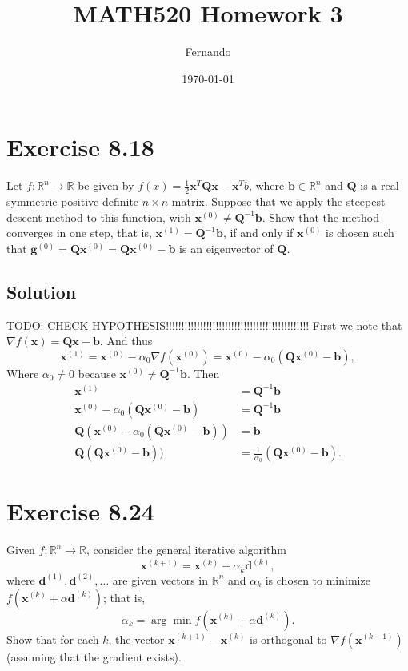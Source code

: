 \documentclass{article}
\newcommand{\bld}[1]{\boldsymbol{#1}}
\begin{document}
\title{MATH520 Homework 3}
\author{Fernando}
\date{\today}
\maketitle

\section*{Exercise 8.18}
Let $f:\mathbb{R}^n\to\mathbb{R}$ be given by
$f(x)=\frac{1}{2}\bld{x}^T\bld{Q}\bld{x}-\bld{x}^Tb$, where
$\bld{b}\in\mathbb{R}^n$ and $\bld{Q}$ is a real symmetric positive definite
$n\times n$ matrix. Suppose that we apply the steepest descent method to this
function, with $\bld{x}^{(0)}\neq \bld{Q}^{-1}\bld{b}$. Show that the method
converges in one step, that is, $\bld{x}^{(1)}=\bld{Q}^{-1}\bld{b}$, if and
only if $\bld{x}^{(0)}$ is chosen such that
$\bld{g}^{(0)}=\bld{Q}\bld{x}^{(0)}=\bld{Q}\bld{x}^{(0)}-\bld{b}$ is an
eigenvector of $\bld{Q}$.
\subsection*{Solution}
TODO: CHECK HYPOTHESIS!!!!!!!!!!!!!!!!!!!!!!!!!!!!!!!!!!!!!!!!!!!!!!
First we note that $\nabla f(\bld{x})=\bld{Q}\bld{x}-\bld{b}$. And thus
\[
\bld{x}^{(1)}=\bld{x}^{(0)}-\alpha_0\nabla
f(\bld{x}^{(0)})=\bld{x}^{(0)}-\alpha_0(\bld{Q}\bld{x}^{(0)}-\bld{b}),
\]
Where $\alpha_0\neq 0$ because $\bld{x}^{(0)}\neq \bld{Q}^{-1}\bld{b}$.
Then
\begin{align*}
	\bld{x}^{(1)}&=\bld{Q}^{-1}\bld{b}\\
	\bld{x}^{(0)}-\alpha_0(\bld{Q}\bld{x}^{(0)}-\bld{b})&=\bld{Q}^{-1}\bld{b}\\
	\bld{Q}(\bld{x}^{(0)}-\alpha_0(\bld{Q}\bld{x}^{(0)}-\bld{b}))&=\bld{b}\\
	\bld{Q}(\bld{Q}\bld{x}^{(0)}-\bld{b}))&=\frac{1}{\alpha_0}(\bld{Q}\bld{x}^{(0)}-\bld{b}).
\end{align*}
\section*{Exercise 8.24}
Given $f:\mathbb{R}^n\to \mathbb{R}$, consider the general iterative algorithm
\[
	\bld{x}^{(k+1)}=\bld{x}^{(k)}+\alpha_k\bld{d}^{(k)},
\]
where $\bld{d}^{(1)},\bld{d}^{(2)},\dots$ are given vectors in $\mathbb{R}^n$
and $\alpha_k$ is chosen to minimize $f(\bld{x}^{(k)}+\alpha \bld{d}^{(k)})$;
that is,
\[
	\alpha_k = \arg \min f(\bld{x}^{(k)}+\alpha \bld{d}^{(k)}).
\]
Show that for each $k$, the vector $\bld{x}^{(k+1)}-\bld{x}^{(k)}$ is
orthogonal to $\nabla f(\bld{x}^{(k+1)})$ (assuming that the gradient exists).
\end{document}
